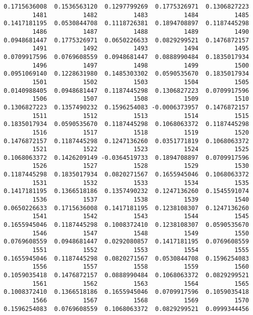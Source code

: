 \documentclass[
  letterpaper,
  DIV=11,
  numbers=noendperiod]{scrreprt}
\begin{document}
\begin{verbatim}
 0.1715636008  0.1536563120  0.1297799269  0.1775326971  0.1306827223 
         1481          1482          1483          1484          1485 
 0.1417181195  0.0530844708  0.1118726381  0.1894708897  0.1187445298 
         1486          1487          1488          1489          1490 
 0.0948681447  0.1775326971  0.0650226633  0.0829299521  0.1476872157 
         1491          1492          1493          1494          1495 
 0.0709917596  0.0769608559  0.0948681447  0.0888990484  0.1835017934 
         1496          1497          1498          1499          1500 
 0.0951069140  0.1228631980  0.1485303302  0.0590535670  0.1835017934 
         1501          1502          1503          1504          1505 
 0.0140988405  0.0948681447  0.1187445298  0.1306827223  0.0709917596 
         1506          1507          1508          1509          1510 
 0.1306827223  0.1357490232  0.1596254083 -0.0006373957  0.1476872157 
         1511          1512          1513          1514          1515 
 0.1835017934  0.0590535670  0.1187445298  0.1068063372  0.1187445298 
         1516          1517          1518          1519          1520 
 0.1476872157  0.1187445298  0.1247136260  0.0351771819  0.1068063372 
         1521          1522          1523          1524          1525 
 0.1068063372  0.1426209149 -0.0364519733  0.1894708897  0.0709917596 
         1526          1527          1528          1529          1530 
 0.1187445298  0.1835017934  0.0820271567  0.1655945046  0.1068063372 
         1531          1532          1533          1534          1535 
 0.1417181195  0.1366518186  0.1357490232  0.1247136260  0.1545591074 
         1536          1537          1538          1539          1540 
 0.0650226633  0.1715636008  0.1417181195  0.1238108307  0.1247136260 
         1541          1542          1543          1544          1545 
 0.1655945046  0.1187445298  0.1008372410  0.1238108307  0.0590535670 
         1546          1547          1548          1549          1550 
 0.0769608559  0.0948681447  0.0292080857  0.1417181195  0.0769608559 
         1551          1552          1553          1554          1555 
 0.1655945046  0.1187445298  0.0820271567  0.0530844708  0.1596254083 
         1556          1557          1558          1559          1560 
 0.1059035418  0.1476872157  0.0888990484  0.1068063372  0.0829299521 
         1561          1562          1563          1564          1565 
 0.1008372410  0.1366518186  0.1655945046  0.0709917596  0.1059035418 
         1566          1567          1568          1569          1570 
 0.1596254083  0.0769608559  0.1068063372  0.0829299521  0.0999344456 

\end{verbatim}
\end{document}
